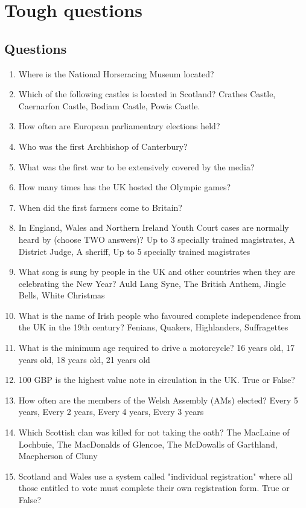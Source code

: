 \documentclass{amsart}
\begin{document}
\newpage
\section{Tough questions}

\subsection{Questions}
\begin{enumerate}
\item Where is the National Horseracing Museum located? 
\item Which of the following castles is located in Scotland? Crathes Castle,
  Caernarfon Castle,
  Bodiam Castle,
  Powis Castle.
 \item How often are European parliamentary elections held?
 \item Who was the first Archbishop of Canterbury?
 \item What was the first war to be extensively covered by the media?
 \item How many times has the UK hosted the Olympic games?
 \item When did the first farmers come to Britain?
 \item In England, Wales and Northern Ireland Youth Court cases are normally heard by (choose TWO answers)?
  Up to 3 specially trained magistrates,
  A District Judge,
  A sheriff,
  Up to 5 specially trained magistrates
  \item What song is sung by people in the UK and other countries when they are celebrating the New Year?
  Auld Lang Syne,
  The British Anthem,
  Jingle Bells,
  White Christmas
  \item What is the name of Irish people who favoured complete independence from the UK in the 19th century? Fenians,
  Quakers,
  Highlanders,
  Suffragettes
  \item What is the minimum age required to drive a motorcycle? 16 years old,
  17 years old,
  18 years old,
  21 years old
  \item 100 GBP is the highest value note in circulation in the UK. True or False?
  \item How often are the members of the Welsh Assembly (AMs) elected?
Every 5 years, Every 2 years, Every 4 years, Every 3 years 
	\item Which Scottish clan was killed for not taking the oath? The MacLaine of Lochbuie, The MacDonalds of Glencoe, The McDowalls of Garthland, Macpherson of Cluny
	\item Scotland and Wales use a system called "individual registration" where all those entitled to vote must complete their own registration form. True or False?

\end{enumerate}
\end{document}
